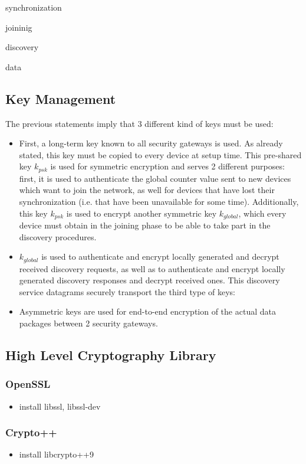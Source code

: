 synchronization

joininig

discovery

data

\subsection{Key Management}

The previous statements imply that 3 different kind of keys must be used:

\begin{itemize}
 \item First, a long-term key known to all security gateways is used. As already stated, this key must be copied to every device at setup time. 
This pre-shared key $k_{psk}$ is used for symmetric encryption and serves 2 different purposes: first, it is used to authenticate the global counter
value sent to  new devices which want to join the network, as well for devices that have lost their synchronization (i.e. that have been unavailable for some
 time). Additionally, this key $k_{psk}$ is used to encrypt another symmetric key $k_{global}$, which every device must obtain in the joining phase to be 
 able to take part in the discovery procedures. 
 \item $k_{global}$ is used to authenticate and encrypt locally generated and decrypt received discovery requests, as well as to authenticate and encrypt
 locally generated discovery responses and decrypt received ones. This discovery service datagrams securely transport the third type of keys:
 \item Asymmetric keys are used for end-to-end encryption of the actual data packages between 2 security gateways.
\end{itemize}

\subsection{High Level Cryptography Library}

\subsubsection{OpenSSL}

\begin{itemize}
 \item install libssl, libssl-dev
\end{itemize}

\subsubsection{Crypto++}
\begin{itemize}
 \item install  libcrypto++9
\end{itemize}